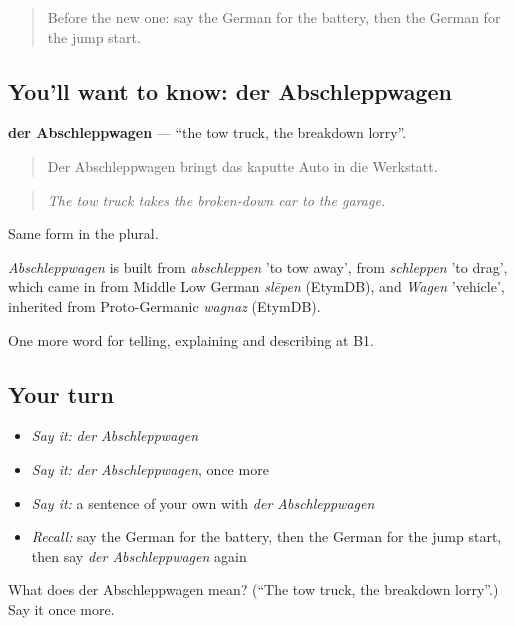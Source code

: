\begin{quote}
Before the new one: say the German for the battery, then the German for the jump start.
\end{quote}

\subsection*{You'll want to know: der Abschleppwagen}
\textbf{der Abschleppwagen} — \textquotedblleft{}the tow truck, the breakdown lorry\textquotedblright{}.

\begin{quote}
Der Abschleppwagen bringt das kaputte Auto in die Werkstatt.
\end{quote}

\begin{quote}
\emph{The tow truck takes the broken-down car to the garage.}
\end{quote}

Same form in the plural.

\begin{cousinweb}
\emph{Abschleppwagen} is built from \emph{abschleppen} 'to tow away', from \emph{schleppen} 'to drag', which came in from Middle Low German \emph{slēpen} (EtymDB), and \emph{Wagen} 'vehicle', inherited from Proto-Germanic \emph{wagnaz} (EtymDB).
\end{cousinweb}

\begin{grammarlens}[title={What you've built}]
One more word for telling, explaining and describing at B1.
\end{grammarlens}

\subsection*{Your turn}
\begin{itemize}
\raggedright
  \item \emph{Say it:} \emph{der Abschleppwagen}
  \item \emph{Say it:} \emph{der Abschleppwagen}, once more
  \item \emph{Say it:} a sentence of your own with \emph{der Abschleppwagen}
  \item \emph{Recall:} say the German for the battery, then the German for the jump start, then say \emph{der Abschleppwagen} again
\end{itemize}

\begin{tcolorbox}[breakable,colback=teal!4,colframe=teal!35!black,title={Before you move on}]
What does der Abschleppwagen mean? (\textquotedblleft{}The tow truck, the breakdown lorry\textquotedblright{}.) Say it once more.
\end{tcolorbox}
